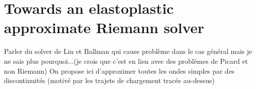 \section{Towards an elastoplastic approximate Riemann solver}
Parler du solver de Lin et Ballman qui cause problème dans le cas général mais je ne sais plus pourquoi...(je crois que c'est en lien avec des problèmes de Picard et non Riemann)
On propose ici d'approximer toutes les ondes simples par des discontinuités (motivé par les trajets de chargement tracés au-dessus)
\cite{Lin_et_Ballman}
